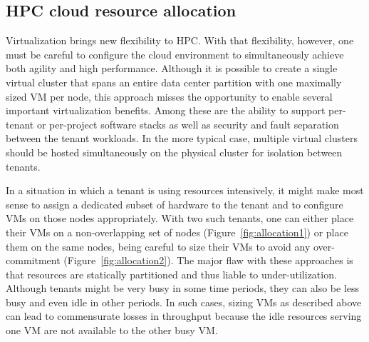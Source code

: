 \subsection{HPC cloud resource allocation}
Virtualization brings new flexibility to HPC. With that flexibility, however, one must be careful to configure 
the cloud environment to simultaneously achieve both agility and high performance.
Although it is possible to create a single virtual cluster that spans an entire data center partition
with one maximally sized VM per node, this approach misses the opportunity to enable several important 
virtualization benefits. Among these are the ability to support per-tenant or per-project software stacks as well 
as security and fault separation between the tenant workloads. In the more typical case, multiple virtual 
clusters should be hosted simultaneously on the physical cluster for isolation between tenants.

In a situation in which a tenant is using resources intensively, it might make most sense to assign 
a dedicated subset of hardware to the tenant and to configure VMs on those nodes appropriately. 
With two such tenants, one can either place their VMs on a non-overlapping set of nodes (Figure~\ref{fig:allocation1})
or place them on the same nodes, being careful to size their VMs to avoid any over-commitment (Figure~\ref{fig:allocation2}). 
The major flaw with these approaches is that resources are statically partitioned and thus liable to under-utilization. 
Although tenants might be very busy in some 
time periods, they can also be less busy and even idle in other periods. In such cases, sizing VMs as 
described above can lead to commensurate losses in 
throughput because the idle resources serving one VM are not available to the other busy VM.

